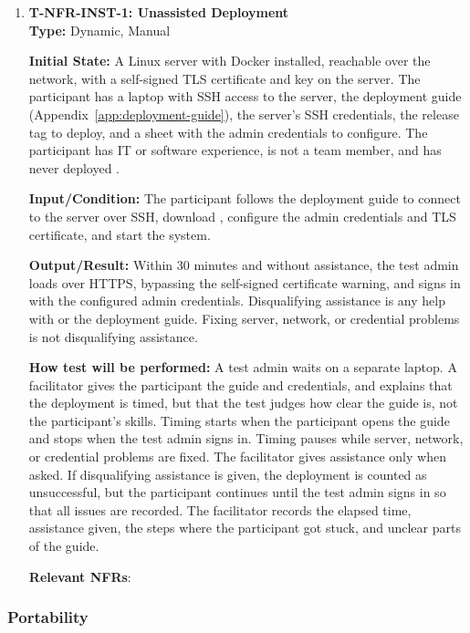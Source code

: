 \documentclass[12pt, titlepage]{article}
\providecommand{\descriptiveid}[1]{\texttt{\detokenize{#1}}}
\providecommand{\nfrref}[1]{\descriptiveid{#1}}
\newcommand{\deployTime}{30 minutes}
\begin{document}
\begin{enumerate}

\item \label{T-NFR-INST-1}\textbf{T-NFR-INST-1: Unassisted Deployment}\\

\textbf{Type:} Dynamic, Manual

\textbf{Initial State:} A Linux server with Docker installed, reachable
over the network, with a self-signed TLS certificate and key on the server. The
participant has a laptop with SSH access to the server, the deployment guide
(Appendix~\ref{app:deployment-guide}), the server's SSH credentials, the release tag to deploy, and a sheet with the
admin credentials to configure. The participant has IT or software experience, is not a \projname{}
team member, and has never deployed \projname{}.

\textbf{Input/Condition:} The participant follows the deployment guide to
connect to the server over SSH, download \projname{}, configure the admin
credentials and TLS certificate, and start the system.

\textbf{Output/Result:} Within \deployTime{} and without assistance, the test
admin loads \projname{} over HTTPS, bypassing the self-signed certificate
warning, and signs in with the configured admin credentials. Disqualifying assistance is any
help with \projname{} or the deployment guide. Fixing server, network, or
credential problems is not disqualifying assistance.

\textbf{How test will be performed:} A test admin waits on a separate laptop.
A facilitator gives the participant the guide and credentials, and explains that the deployment is timed, but that the
test judges how clear the guide is, not the participant's skills. Timing starts
when the participant opens the guide and
stops when the test admin signs in. Timing pauses while server, network, or
credential problems are fixed. The facilitator gives assistance only when
asked. If disqualifying assistance is given, the deployment is counted as
unsuccessful, but the participant continues until the test admin signs in so
that all issues are recorded. The facilitator
records the elapsed time, assistance given, the steps where the participant
got stuck, and unclear parts of the guide.

\textbf{Relevant NFRs}: \nfrref{NFR_DeployUnassisted}

\end{enumerate}

\subsubsection{Portability}
\end{document}
